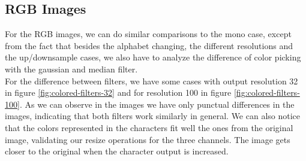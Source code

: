 \documentclass[]{IEEEtran}
\begin{document}
\subsection{RGB Images}

For the RGB images, we can do similar comparisons to the mono case, except from the fact that besides the alphabet changing, the different resolutions and the up/downsample cases, we also have to analyze the difference of color picking with the gaussian and median filter. 
\\For the difference between filters, we have some cases with output resolution 32 in figure \ref{fig:colored-filters-32} and for resolution 100 in figure \ref{fig:colored-filters-100}. As we can observe in the images we have only punctual differences in the images, indicating that both filters work similarly in general. We can also notice that the colors represented in the characters fit well the ones from the original image, validating our resize operations for the three channels. The image gets closer to the original when the character output is increased.


\end{document}
